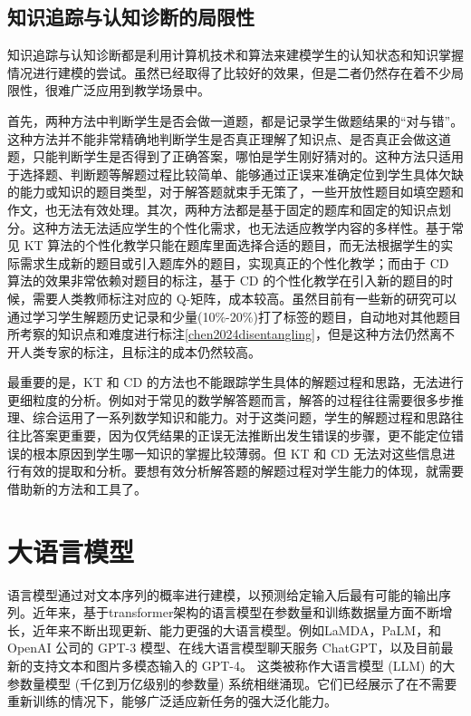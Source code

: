 \subsection{知识追踪与认知诊断的局限性}

知识追踪与认知诊断都是利用计算机技术和算法来建模学生的认知状态和知识掌握情况进行建模的尝试。虽然已经取得了比较好的效果，但是二者仍然存在着不少局限性，很难广泛应用到教学场景中。

首先，两种方法中判断学生是否会做一道题，都是记录学生做题结果的“对与错”。这种方法并不能非常精确地判断学生是否真正理解了知识点、是否真正会做这道题，只能判断学生是否得到了正确答案，哪怕是学生刚好猜对的。这种方法只适用于选择题、判断题等解题过程比较简单、能够通过正误来准确定位到学生具体欠缺的能力或知识的题目类型，对于解答题就束手无策了，一些开放性题目如填空题和作文，也无法有效处理。其次，两种方法都是基于固定的题库和固定的知识点划分。这种方法无法适应学生的个性化需求，也无法适应教学内容的多样性。基于常见 KT 算法的个性化教学只能在题库里面选择合适的题目，而无法根据学生的实际需求生成新的题目或引入题库外的题目，实现真正的个性化教学；而由于 CD 算法的效果非常依赖对题目的标注，基于 CD 的个性化教学在引入新的题目的时候，需要人类教师标注对应的 Q-矩阵，成本较高。虽然目前有一些新的研究可以通过学习学生解题历史记录和少量(10\%-20\%)打了标签的题目，自动地对其他题目所考察的知识点和难度进行标注\ref{chen2024disentangling}，但是这种方法仍然离不开人类专家的标注，且标注的成本仍然较高。

最重要的是，KT 和 CD 的方法也不能跟踪学生具体的解题过程和思路，无法进行更细粒度的分析。例如对于常见的数学解答题而言，解答的过程往往需要很多步推理、综合运用了一系列数学知识和能力。对于这类问题，学生的解题过程和思路往往比答案更重要，因为仅凭结果的正误无法推断出发生错误的步骤，更不能定位错误的根本原因到学生哪一知识的掌握比较薄弱。但 KT 和 CD 无法对这些信息进行有效的提取和分析。要想有效分析解答题的解题过程对学生能力的体现，就需要借助新的方法和工具了。

\section{大语言模型}

语言模型通过对文本序列的概率进行建模，以预测给定输入后最有可能的输出序列。近年来，基于transformer架构\cite{vaswani2017attention}的语言模型在参数量和训练数据量方面不断增长，近年来不断出现更新、能力更强的大语言模型。例如LaMDA\cite{thoppilan2022lamda}，PaLM\cite{anil2023palm}，和 OpenAI 公司的 GPT-3 模型\cite{brown2020language}、在线大语言模型聊天服务 ChatGPT\cite{abdullah2022chatgpt}，以及目前最新的支持文本和图片多模态输入的 GPT-4\cite{achiam2023gpt}。 这类被称作大语言模型 (LLM) 的大参数量模型 (千亿到万亿级别的参数量) 系统相继涌现。它们已经展示了在不需要重新训练的情况下，能够广泛适应新任务的强大泛化能力。

